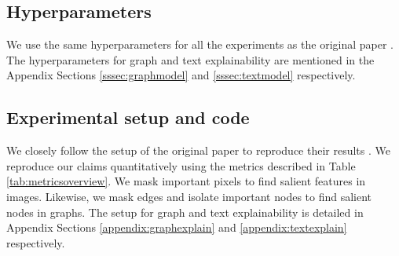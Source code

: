 \subsection{Hyperparameters}


We use the same hyperparameters for all the experiments as the original paper \citep{mainpaper}. The hyperparameters for graph and text explainability are mentioned in the Appendix Sections \ref{sssec:graphmodel} and \ref{sssec:textmodel} respectively.

\subsection{Experimental setup and code}\label{sec:expsetup}
We closely follow the setup of the original paper to reproduce their results \citep{mainpaper}. We reproduce our claims quantitatively using the metrics described in Table \ref{tab:metricsoverview}.  
We mask important pixels to find salient features in images. Likewise, we mask edges and isolate important nodes to find salient nodes in graphs. The setup for graph and text explainability is detailed in Appendix Sections \ref{appendix:graphexplain} and \ref{appendix:textexplain} respectively. 


